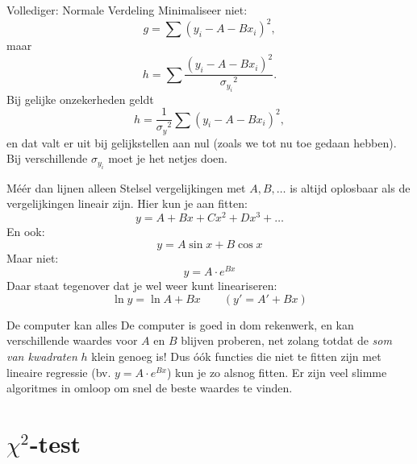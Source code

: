 \documentclass{beamer}
\begin{document}
\begin{frame}{Vollediger: Normale Verdeling}
  Minimaliseer \alert{niet}:
  \begin{equation*}
    g = \sum(y_i - A - Bx_i)^2,
  \end{equation*}
  maar
  \begin{equation*}
    h = \sum\frac{(y_i - A - Bx_i)^2}{{\sigma_{y_i}}^2}.
  \end{equation*}
  Bij gelijke onzekerheden geldt
  \begin{equation*}
    h = \frac{1}{{\sigma_y}^2}\sum(y_i - A - Bx_i)^2,
  \end{equation*}
  en dat valt er uit bij gelijkstellen aan nul (zoals we tot nu toe gedaan hebben). Bij verschillende $\sigma_{y_i}$ moet je het netjes doen.
\end{frame}

\begin{frame}{Méér dan lijnen alleen}
  Stelsel vergelijkingen met $A, B, \ldots$ is altijd oplosbaar als de vergelijkingen \alert{lineair} zijn. Hier kun je aan fitten:
  \begin{equation*}
    y = A + Bx + Cx^2 + Dx^3 + \ldots
  \end{equation*}
  \pause
  En ook:
  \begin{equation*}
    y = A\sin x + B\cos x
  \end{equation*}
  \pause
  Maar niet:
  \begin{equation*}
    y = A\cdot e^{Bx}
  \end{equation*}
  \pause
  Daar staat tegenover dat je wel weer kunt \alert{lineariseren}:
  \begin{equation*}
    \ln y = \ln A + Bx  \qquad (y' = A' + Bx)
  \end{equation*}
\end{frame}

\begin{frame}{De computer kan alles}
  De computer is goed in dom rekenwerk, en kan verschillende waardes voor $A$ en $B$ blijven proberen, net zolang totdat de \emph{som van kwadraten} $h$ klein genoeg is! Dus óók functies die niet te fitten zijn met lineaire regressie (bv. $y = A\cdot e^{Bx}$) kun je zo alsnog fitten. Er zijn veel slimme algoritmes in omloop om snel de beste waardes te vinden.
\end{frame}


\section{$\chi^2$-test}
\end{document}
